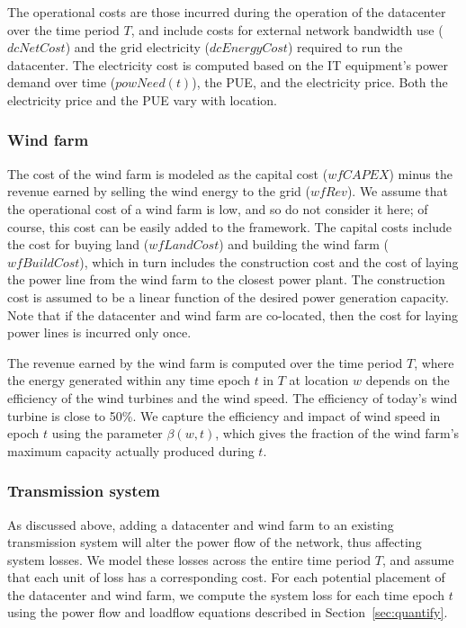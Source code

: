 The operational costs are those incurred during the operation of the datacenter over the time period $T$, and include costs for external network bandwidth use ($dcNetCost$) and the grid electricity ($dcEnergyCost$) required to run the datacenter.
The electricity cost is computed based on the IT equipment's power demand over time ($powNeed(t)$), the PUE, and the electricity price.  Both the electricity price and the PUE vary with location.


\subsubsection{Wind farm}  The cost of the wind farm is modeled as the capital cost ($wfCAPEX$) minus the revenue earned by selling the wind energy to the grid ($wfRev$).  We assume that the operational cost of a wind farm is low, and so do not consider it here; of course, this cost can be easily added to the framework.  The capital costs include the cost for buying land ($wfLandCost$) and building the wind farm ($wfBuildCost$), which in turn includes the construction cost and the cost of laying the power line from the wind farm to the closest power plant.  The construction cost is assumed to be a linear function of the desired power generation capacity.  Note that if the datacenter and wind farm are co-located, then the cost for laying power lines is incurred only once.

The revenue earned by the wind farm is computed over the time period $T$, where the energy generated within any time epoch $t$ in $T$ at location $w$ depends on the efficiency of the wind turbines and the wind speed.  The efficiency of today's wind turbine is close to 50\%.  We capture the efficiency and impact of wind speed in epoch $t$ using the parameter $\beta(w,t)$, which gives the fraction of the wind farm's maximum capacity actually produced during $t$.

\subsubsection{Transmission system} As discussed above, adding a datacenter and wind farm to an existing transmission system will alter the power flow of the network, thus affecting system losses.  We model these losses across the entire time period $T$, and assume that each unit of loss has a corresponding cost.  For each potential placement of the datacenter and wind farm, we compute the system loss for each time epoch $t$ using the power flow and loadflow equations described in Section~\ref{sec:quantify}.

